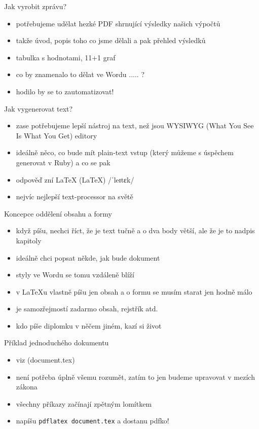 \documentclass{beamer}
\begin{document}
\begin{frame}{Jak vyrobit zprávu?}
  \begin{itemize}
    \item potřebujeme udělat hezké PDF shrnující výsledky našich výpočtů
    \item takže úvod, popis toho co jsme dělali a pak přehled výsledků
    \item tabulka s hodnotami, 11+1 graf
    \item co by znamenalo to dělat ve Wordu ..... ?
    \item hodilo by se to zautomatizovat!
  \end{itemize}
\end{frame}

\begin{frame}{Jak vygenerovat text?}
  \begin{itemize}
    \item zase potřebujeme lepší nástroj na text, než jsou WYSIWYG (What You See Is What You Get) editory
    \item ideálně něco, co bude mít plain-text vstup (který můžeme s úspěchem generovat v Ruby) a co se pak 
    \item odpověď zní LaTeX (\LaTeX) /ˈleɪtɛk/
    \item nejvíc nejlepší text-processor na světě
  \end{itemize}
\end{frame}

\begin{frame}{Koncepce oddělení obsahu a formy}
  \begin{itemize}
    \item když píšu, nechci říct, že je text tučně a o dva body větší, ale že je to nadpis kapitoly
    \item ideálně chci popsat někde, jak bude dokument
    \item styly ve Wordu se tomu vzdáleně blíží
    \item v LaTeXu vlastně píšu jen obsah a o formu se musím starat jen hodně málo
    \item je samozřejmostí zadarmo obsah, rejstřík atd.
    \item kdo píše diplomku v něčem jiném, kazí si život
  \end{itemize}
\end{frame}

\begin{frame}{Příklad jednoduchého dokumentu}
  \begin{itemize}
    \item viz (document.tex)
    \item není potřeba úplně všemu rozumět, zatím to jen budeme upravovat v mezích zákona
    \item všechny příkazy začínají zpětným lomítkem
    \item napíšu \texttt{pdflatex document.tex} a dostanu pdfko!
  \end{itemize}
\end{frame}
\end{document}
